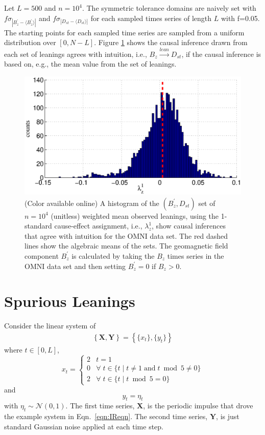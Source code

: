 \documentclass[twocolumn,aps,pre,groupedaddress]{revtex4-1}
\begin{document}
Let $L=500$ and $n=10^4$.  The symmetric tolerance domains are naively set with $f\sigma_{|B_{z}^\prime-\langle B_{z}^\prime\rangle|}$ and $f\sigma_{|D_{st}-\langle D_{st}\rangle|}$ for each sampled times series of length $L$ with f=0.05.  The starting points for each sampled time series are sampled from a uniform distribution over $[0,N-L]$.  Figure \ref{fig:dsthist} shows the causal inference drawn from each set of leanings agrees with intuition, i.e., $B_{z}\xrightarrow{lean}D_{st}$, if the causal inference is based on, e.g., the mean value from the set of leanings.  
\begin{figure}[ht]
\includegraphics[scale=0.40]{SolarDataBzNormDst.eps} 
\caption{(Color available online) A histogram of the $(B_z^\prime,D_{st})$ set of $n=10^4$ (unitless) weighted mean observed leanings, using the 1-standard cause-effect assignment, i.e., $\lambda^1_{z}$, show causal inferences that agree with intuition for the OMNI data set.  The red dashed lines show the algebraic means of the sets.  The geomagnetic field component $B_z^\prime$ is calculated by taking the $B_z$ times series in the OMNI data set and then setting $B_z^\prime = 0$ if $B_z>0$.}
\label{fig:dsthist}
\end{figure}

\section{Spurious Leanings}
Consider the linear system of
\begin{eqnarray}
\label{eqn:Spur}
\left\{\mathbf{X},\mathbf{Y}\right\} = \left\{\{x_t\},\{y_t\}\right\}
\end{eqnarray}
where $t\in[0,L]$,
\begin{equation*}
x_t = \left\{
  \begin{array}{lr}
    2 & t = 1\\
    0 & \forall\; t\in\{t\;|\;t\neq 1 \;\mathrm{and}\; t\bmod 5 \neq 0\}\\
    2 & \forall\; t\in\{t\;|\;t\bmod 5 = 0\}
  \end{array}
\right.
\end{equation*}
and
\begin{equation*}
y_t = \eta_t
\end{equation*}
with $\eta_t\sim\mathcal{N}\left(0,1\right)$.  The first time series, $\mathbf{X}$, is the periodic impulse that drove the example system in Eqn.\ \ref{eqn:IReqn}.  The second time series, $\mathbf{Y}$, is just standard Gaussian noise applied at each time step.  
\end{document}
